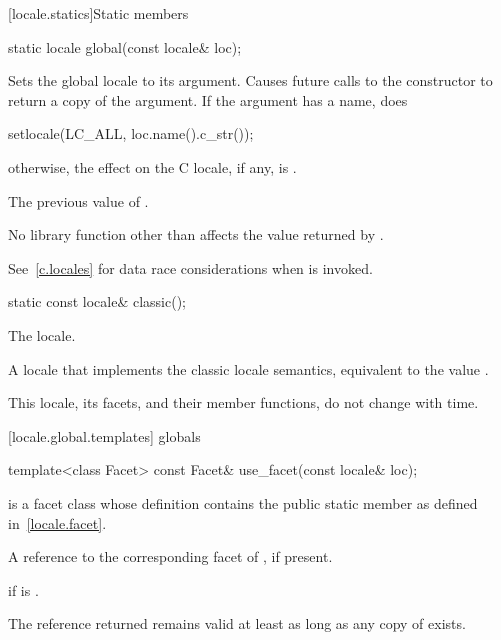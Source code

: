 [locale.statics]{Static members}

%
\begin{itemdecl}
static locale global(const locale& loc);
\end{itemdecl}

\begin{itemdescr}
\pnum
\effects
Sets the global locale to its argument.
Causes future calls to the constructor 
to return a copy of the argument.
If the argument has a name, does
\begin{codeblock}
setlocale(LC_ALL, loc.name().c_str());
\end{codeblock}
otherwise, the effect on the C locale, if any, is
.

\pnum
\returns
The previous value of .

\pnum
\remarks
No library function other than 
affects the value returned by .
\begin{note}
See~\ref{c.locales} for data race considerations
when  is invoked.
\end{note}
\end{itemdescr}

%
\begin{itemdecl}
static const locale& classic();
\end{itemdecl}

\begin{itemdescr}
\pnum
The  locale.

\pnum
\returns
A locale that implements the classic  locale semantics,
equivalent to the value .

\pnum
\remarks
This locale, its facets, and their member functions, do not change with time.
\end{itemdescr}

[locale.global.templates]{ globals}

%
\begin{itemdecl}
template<class Facet> const Facet& use_facet(const locale& loc);
\end{itemdecl}

\begin{itemdescr}
\pnum
\mandates
{} is a facet class
whose definition contains the public static member 
as defined in~\ref{locale.facet}.

\pnum
\returns
A reference to the corresponding facet of , if present.

\pnum
\throws
{} if  is .

\pnum
\remarks
The reference returned remains valid
at least as long as any copy of  exists.
\end{itemdescr}

